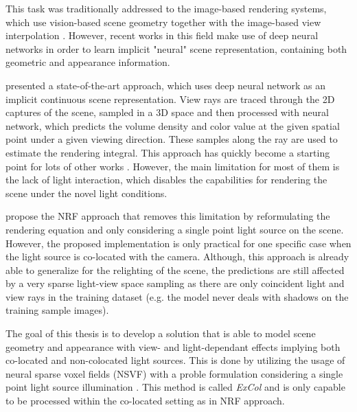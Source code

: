 This task was traditionally addressed to the image-based rendering systems,
which use vision-based scene geometry together with the image-based view interpolation \cite{shumandkang2000}.
However, recent works in this field make use of deep neural networks
in order to learn implicit "neural" scene representation,
containing both geometric and appearance information. \cite{tewari2020state}

\cite{mildenhall2020nerf} presented a state-of-the-art approach,
which uses deep neural network as an implicit continuous scene representation.
View rays are traced through the 2D captures of the scene,
sampled in a 3D space and then processed with neural network,
which predicts the volume density and color value at the given spatial point under a given viewing direction.
These samples along the ray are used to estimate the rendering integral.
This approach has quickly become a starting point for lots of other works \cite{liu2021neural, garbin2021fastnerf, reiser2021kilonerf, yu2021plenoctrees, rebain2020derf, lindell2021autoint}.
However, the main limitation for most of them is the lack of light interaction,
which disables the capabilities for rendering the scene under the novel light conditions.

\cite{bi2020neural} propose the NRF approach
that removes this limitation by reformulating the rendering equation
and only considering a single point light source on the scene.
However, the proposed implementation is only practical for one specific case
when the light source is co-located with the camera.
Although, this approach is already able to generalize for the relighting of the scene,
the predictions are still affected by a very sparse light-view space sampling
as there are only coincident light and view rays in the training dataset
(e.g. the model never deals with shadows on the training sample images).


The goal of this thesis is to develop a solution
that is able to model scene geometry and appearance with view- and light-dependant effects
implying both co-located and non-colocated light sources.
This is done by utilizing the usage of neural sparse voxel fields (NSVF) \cite{liu2021neural}
with a proble formulation considering a single point light source illumination \cite{bi2020neural}.
This method is called \textit{ExCol} and is only capable
to be processed within the co-located setting as in NRF approach.

